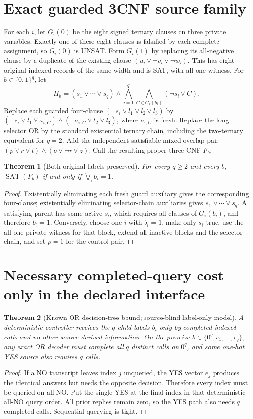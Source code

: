 \documentclass[11pt]{article}
\newtheorem{theorem}{Theorem}
\begin{document}
\section{Exact guarded 3CNF source family}
For each $i$, let $G_i(0)$ be the eight signed ternary clauses on three private variables. Exactly one of these eight clauses is falsified by each complete assignment, so $G_i(0)$ is UNSAT. Form $G_i(1)$ by replacing its all-negative clause by a duplicate of the existing clause $(u_i\vee\neg v_i\vee\neg w_i)$. This has eight original indexed records of the same width and is SAT, with all-one witness. For $b\in\{0,1\}^q$, let
\[
H_b=(s_1\vee\cdots\vee s_q)\wedge
\bigwedge_{i=1}^q\bigwedge_{C\in G_i(b_i)}(\neg s_i\vee C).
\]
Replace each guarded four-clause $(\neg s_i\vee l_1\vee l_2\vee l_3)$ by
$(\neg s_i\vee l_1\vee a_{i,C})\wedge(\neg a_{i,C}\vee l_2\vee l_3)$,
where $a_{i,C}$ is fresh. Replace the long selector OR by the standard existential ternary chain, including the two-ternary equivalent for $q=2$. Add the independent satisfiable mixed-overlap pair
$(p\vee r\vee t)\wedge(p\vee\neg r\vee z)$.
Call the resulting proper three-CNF $F_b$.

\begin{theorem}[Both original labels preserved]
For every $q\ge2$ and every $b$, $\operatorname{SAT}(F_b)$ if and only if $\bigvee_i b_i=1$.
\end{theorem}
\begin{proof}
Existentially eliminating each fresh guard auxiliary gives the corresponding four-clause; existentially eliminating selector-chain auxiliaries gives $s_1\vee\cdots\vee s_q$. A satisfying parent has some active $s_i$, which requires all clauses of $G_i(b_i)$, and therefore $b_i=1$. Conversely, choose one $i$ with $b_i=1$, make only $s_i$ true, use the all-one private witness for that block, extend all inactive blocks and the selector chain, and set $p=1$ for the control pair.
\end{proof}

\section{Necessary completed-query cost only in the declared interface}
\begin{theorem}[Known OR decision-tree bound; source-blind label-only model]
A deterministic controller receives the $q$ child labels $b_i$ only by completed indexed calls and no other source-derived information. On the promise $b\in\{0^q,e_1,\dots,e_q\}$, any exact OR decoder must complete all $q$ distinct calls on $0^q$, and some one-hot YES source also requires $q$ calls.
\end{theorem}
\begin{proof}
If a NO transcript leaves index $j$ unqueried, the YES vector $e_j$ produces the identical answers but needs the opposite decision. Therefore every index must be queried on all-NO. Put the single YES at the final index in that deterministic all-NO query order. All prior replies remain zero, so the YES path also needs $q$ completed calls. Sequential querying is tight.
\end{proof}
\end{document}
